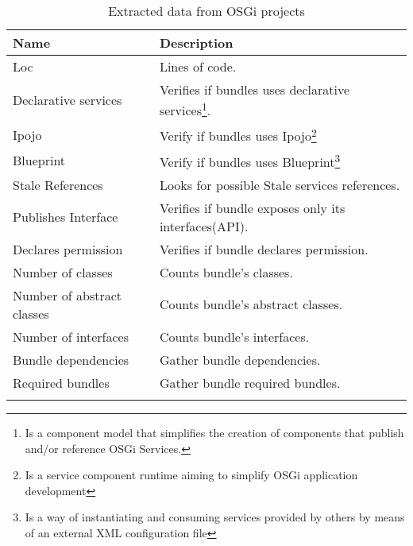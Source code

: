 \begin{table}[h]
\caption{Extracted data from OSGi projects}
\label{extracted-data}
\begin{center}
    \begin{tabular}{  p{4cm} | p{8cm} }
    \Xhline{2\arrayrulewidth}
    Name & Description\\  \hline
    Loc & Lines of code.\\ \hline
    Declarative services & Verifies if bundles uses declarative services\footnote{Is a component model that simplifies the creation of components that publish and/or reference OSGi Services.}.\\ \hline
    Ipojo & Verify if bundles uses Ipojo\footnote{Is a service component runtime aiming to simplify OSGi application development} \\ \hline
    Blueprint & Verify if bundles uses Blueprint\footnote{Is a way of instantiating and consuming services provided by others by means of an external XML configuration file} \\ \hline
    Stale References & Looks for possible Stale services references.\\ \hline
    Publishes Interface & Verifies if bundle exposes only its interfaces(API).\\ \hline
    Declares permission & Verifies if bundle declares permission.\\ \hline
    Number of classes & Counts bundle's classes.\\ \hline
    Number of abstract classes & Counts bundle's abstract classes.\\ \hline
    Number of interfaces & Counts bundle's interfaces.\\ \hline
    Bundle dependencies & Gather bundle dependencies.\\ \hline
    Required bundles & Gather bundle required bundles.\\ \Xhline{2\arrayrulewidth}
    \end{tabular}
\end{center}
\end{table}
\FloatBarrier 

